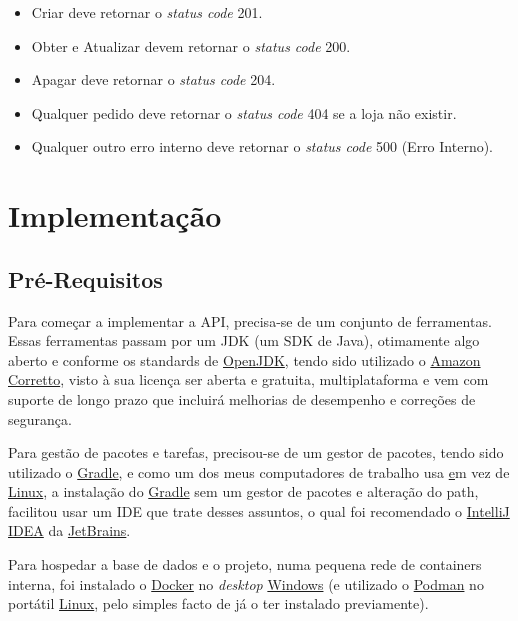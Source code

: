 \begin{itemize}
  \item Criar deve retornar o \textit{status code} 201.
  \item Obter e Atualizar devem retornar o \textit{status code} 200.
  \item Apagar deve retornar o \textit{status code} 204.
  \item Qualquer pedido deve retornar o \textit{status code} 404 se a loja não existir.
  \item Qualquer outro erro interno deve retornar o \textit{status code} 500 (Erro Interno).
\end{itemize}

\newpage

\section{Implementação}

\subsection{Pré-Requisitos}

Para começar a implementar a API, precisa-se de um conjunto de ferramentas. Essas ferramentas passam por um JDK (um SDK de Java), otimamente algo aberto e conforme os standards de \href{https://openjdk.org/}{OpenJDK}, tendo sido utilizado o \href{https://docs.aws.amazon.com/corretto/latest/corretto-17-ug/downloads-list.html}{Amazon Corretto}\cite{corretto}, visto à sua licença ser aberta e gratuita, multiplataforma e vem com suporte de longo prazo que incluirá melhorias de desempenho e correções de segurança.

Para gestão de pacotes e tarefas, precisou-se de um gestor de pacotes, tendo sido utilizado o \href{https://gradle.org/}{Gradle}, e como um dos meus computadores de trabalho usa \href{https://www.microsoft.com/pt-pt/software-download/windows10} em vez de \href{https://archlinux.org/download/}{Linux}, a instalação do \href{https://gradle.org/}{Gradle} sem um gestor de pacotes e alteração do path, facilitou usar um IDE que trate desses assuntos, o qual foi recomendado o \href{https://www.jetbrains.com/idea/}{IntelliJ IDEA} da \href{https://www.jetbrains.com/}{JetBrains}.

Para hospedar a base de dados e o projeto, numa pequena rede de containers interna, foi instalado o \href{https://www.docker.com/}{Docker} no \textit{desktop} \href{https://www.microsoft.com/pt-pt/software-download/windows10}{Windows} (e utilizado o \href{https://podman.io/}{Podman} no portátil \href{https://archlinux.org/download/}{Linux}, pelo simples facto de já o ter instalado previamente).

